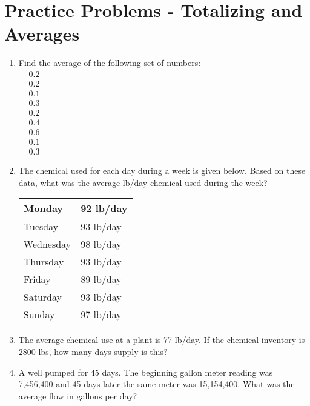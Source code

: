 \section*{Practice Problems - Totalizing and Averages}
\begin{enumerate}

\item Find the average of the following set of numbers:\\
$
\begin{aligned}
&0.2 \\
&0.2 \\
&0.1 \\
&0.3 \\
&0.2 \\
&0.4 \\
&0.6 \\
&0.1 \\
&0.3
\end{aligned}
$
\vspace{0.2cm}
\item The chemical used for each day during a week is given below. Based on these data, what was the average lb/day chemical used during the week?\\

\begin{tabular}{|l|l|}
\hline
Monday & 92 lb/day\\
\hline
Tuesday & 93 lb/day \\
\hline
Wednesday & 98 lb/day\\
\hline
Thursday & 93 lb/day \\
\hline
Friday & 89 lb/day\\
\hline
Saturday & 93 lb/day \\
\hline
Sunday & 97 lb/day\\
\hline
\end{tabular}
\vspace{0.2cm}
\item The average chemical use at a plant is 77 lb/day. If the chemical inventory is 2800 lbs, how many days supply is this?
\vspace{0.2cm}
\item A well pumped for 45 days. The beginning gallon meter reading was 7,456,400 and 45 days later the same meter was 15,154,400. What was the average flow in gallons per day?


\end{enumerate}
